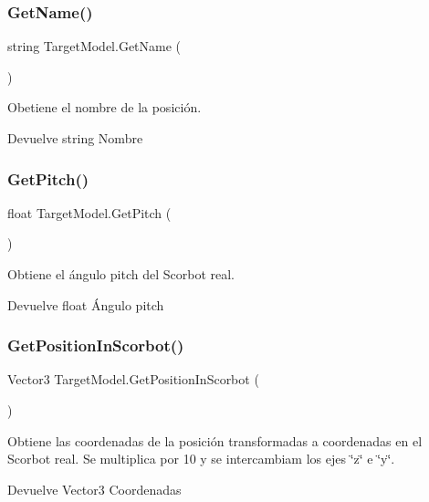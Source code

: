 \subsubsection{\texorpdfstring{GetName()}{GetName()}}
{\footnotesize\ttfamily string Target\+Model.\+Get\+Name (\begin{DoxyParamCaption}{ }\end{DoxyParamCaption})\hspace{0.3cm}{\ttfamily [inline]}}

Obetiene el nombre de la posición. \begin{DoxyReturn}{Devuelve}
string Nombre 
\end{DoxyReturn}
\mbox{\label{class_target_model_a5b6b7410ef505df9da09279ab341eceb}} 
\subsubsection{\texorpdfstring{GetPitch()}{GetPitch()}}
{\footnotesize\ttfamily float Target\+Model.\+Get\+Pitch (\begin{DoxyParamCaption}{ }\end{DoxyParamCaption})\hspace{0.3cm}{\ttfamily [inline]}}

Obtiene el ángulo pitch del Scorbot real. \begin{DoxyReturn}{Devuelve}
float Ángulo pitch 
\end{DoxyReturn}
\mbox{\label{class_target_model_a17e1641d07e21286f6699f4b2b39fef5}} 
\subsubsection{\texorpdfstring{GetPositionInScorbot()}{GetPositionInScorbot()}}
{\footnotesize\ttfamily Vector3 Target\+Model.\+Get\+Position\+In\+Scorbot (\begin{DoxyParamCaption}{ }\end{DoxyParamCaption})\hspace{0.3cm}{\ttfamily [inline]}}

Obtiene las coordenadas de la posición transformadas a coordenadas en el Scorbot real. Se multiplica por 10 y se intercambiam los ejes \char`\"{}z\char`\"{} e \char`\"{}y\char`\"{}. \begin{DoxyReturn}{Devuelve}
Vector3 Coordenadas 
\end{DoxyReturn}
\mbox{\label{class_target_model_a12dc805fa302de9151fac2f8ce959b19}} 
